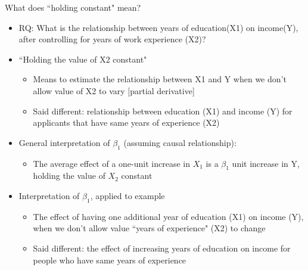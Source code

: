 \begin{frame}[shrink=10]{What does ``holding constant" mean?}
	\begin{itemize}
	\item RQ: What is the relationship between years of education(X1) on income(Y), after controlling for years of work experience (X2)?
	\item ``Holding the value of X2 constant"
		\begin{itemize}
		\item Means to estimate the relationship between X1 and Y when we don't allow value of X2 to vary [partial derivative]
		\item Said different: relationship between education (X1) and income (Y) for applicants that have same years of experience (X2)
		\end{itemize}	
	\item General interpretation of $\beta_{1}$ (assuming causal relationship):
		\begin{itemize}
		\item The average effect of a one-unit increase in $X_{1}$ is a $\beta_{1}$ unit increase in Y, holding the value of $X_{2}$ constant 
		\end{itemize}
	\item Interpretation of $\beta_{1}$, applied to example
		\begin{itemize}
		\item The effect of having one additional year of education (X1) on income (Y), when we don't allow value ``years of experience" (X2) to change
		\item Said different: the effect of increasing years of education on income for people who have same years of experience
		\end{itemize}
	\end{itemize}
\end{frame}



